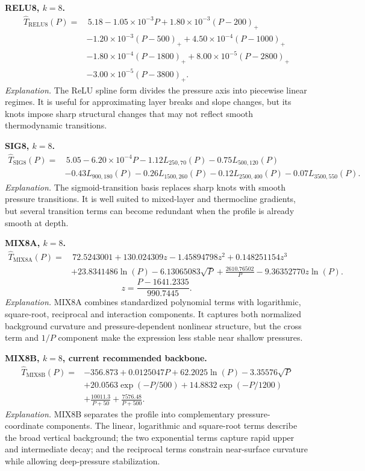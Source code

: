 \documentclass[10pt]{article}
\begin{document}
\vspace{0.35em}
\noindent\textbf{RELU8, $k=8$.}
\[
\begin{aligned}
\hat{T}_{\mathrm{RELU8}}(P)=&\,5.18
-1.05\times10^{-3}P
+1.80\times10^{-3}(P-200)_+ \\
&-1.20\times10^{-3}(P-500)_+
+4.50\times10^{-4}(P-1000)_+ \\
&-1.80\times10^{-4}(P-1800)_+
+8.00\times10^{-5}(P-2800)_+ \\
&-3.00\times10^{-5}(P-3800)_+ .
\end{aligned}
\]
\noindent\emph{Explanation.}
The ReLU spline form divides the pressure axis into piecewise linear regimes. It is useful for approximating layer breaks and slope changes, but its knots impose sharp structural changes that may not reflect smooth thermodynamic transitions.

\vspace{0.35em}
\noindent\textbf{SIG8, $k=8$.}
\[
\begin{aligned}
\hat{T}_{\mathrm{SIG8}}(P)=&\,5.05
-6.20\times10^{-4}P
-1.12L_{250,70}(P)
-0.75L_{500,120}(P) \\
&-0.43L_{900,180}(P)
-0.26L_{1500,260}(P)
-0.12L_{2500,400}(P)
-0.07L_{3500,550}(P).
\end{aligned}
\]
\noindent\emph{Explanation.}
The sigmoid-transition basis replaces sharp knots with smooth pressure transitions. It is well suited to mixed-layer and thermocline gradients, but several transition terms can become redundant when the profile is already smooth at depth.

\vspace{0.35em}
\noindent\textbf{MIX8A, $k=8$.}
\[
\begin{aligned}
\hat{T}_{\mathrm{MIX8A}}(P)=&\,72.5243001
+130.024309z
-1.45894798z^2
+0.148251154z^3 \\
&+23.8341486\ln(P)
-6.13065083\sqrt{P}
+\frac{2610.76502}{P}
-9.36352770z\ln(P).
\end{aligned}
\]
\[
z=\frac{P-1641.2335}{990.7445}.
\]
\noindent\emph{Explanation.}
MIX8A combines standardized polynomial terms with logarithmic, square-root, reciprocal and interaction components. It captures both normalized background curvature and pressure-dependent nonlinear structure, but the cross term and $1/P$ component make the expression less stable near shallow pressures.

\vspace{0.35em}
\noindent\textbf{MIX8B, $k=8$, current recommended backbone.}
\[
\begin{aligned}
\hat{T}_{\mathrm{MIX8B}}(P)=&-356.873
+0.0125047P
+62.2025\ln(P)
-3.35576\sqrt{P} \\
&+20.0563\exp(-P/500)
+14.8832\exp(-P/1200) \\
&+\frac{10011.3}{P+50}
+\frac{7576.48}{P+500}.
\end{aligned}
\]
\noindent\emph{Explanation.}
MIX8B separates the profile into complementary pressure-coordinate components. The linear, logarithmic and square-root terms describe the broad vertical background; the two exponential terms capture rapid upper and intermediate decay; and the reciprocal terms constrain near-surface curvature while allowing deep-pressure stabilization.
\end{document}
